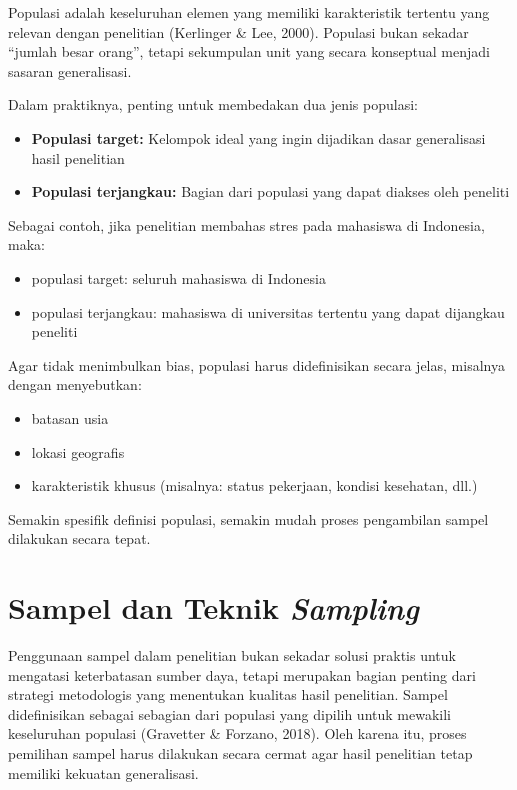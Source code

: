 \documentclass[
  indonesian,
  letterpaper,
  DIV=11,
  numbers=noendperiod]{scrreprt}
\providecommand{\tightlist}{%
  \setlength{\itemsep}{0pt}\setlength{\parskip}{0pt}}
\begin{document}
Populasi adalah keseluruhan elemen yang memiliki karakteristik tertentu
yang relevan dengan penelitian (Kerlinger \& Lee, 2000). Populasi bukan
sekadar ``jumlah besar orang'', tetapi sekumpulan unit yang secara
konseptual menjadi sasaran generalisasi.

Dalam praktiknya, penting untuk membedakan dua jenis populasi:

\begin{itemize}
\tightlist
\item
  \textbf{Populasi target:} Kelompok ideal yang ingin dijadikan dasar
  generalisasi hasil penelitian
\item
  \textbf{Populasi terjangkau:} Bagian dari populasi yang dapat diakses
  oleh peneliti
\end{itemize}

Sebagai contoh, jika penelitian membahas stres pada mahasiswa di
Indonesia, maka:

\begin{itemize}
\tightlist
\item
  populasi target: seluruh mahasiswa di Indonesia
\item
  populasi terjangkau: mahasiswa di universitas tertentu yang dapat
  dijangkau peneliti
\end{itemize}

Agar tidak menimbulkan bias, populasi harus didefinisikan secara jelas,
misalnya dengan menyebutkan:

\begin{itemize}
\tightlist
\item
  batasan usia
\item
  lokasi geografis
\item
  karakteristik khusus (misalnya: status pekerjaan, kondisi kesehatan,
  dll.)
\end{itemize}

Semakin spesifik definisi populasi, semakin mudah proses pengambilan
sampel dilakukan secara tepat.

\section{\texorpdfstring{Sampel dan Teknik
\emph{Sampling}}{Sampel dan Teknik Sampling}}\label{sampel-dan-teknik-sampling}

Penggunaan sampel dalam penelitian bukan sekadar solusi praktis untuk
mengatasi keterbatasan sumber daya, tetapi merupakan bagian penting dari
strategi metodologis yang menentukan kualitas hasil penelitian. Sampel
didefinisikan sebagai sebagian dari populasi yang dipilih untuk mewakili
keseluruhan populasi (Gravetter \& Forzano, 2018). Oleh karena itu,
proses pemilihan sampel harus dilakukan secara cermat agar hasil
penelitian tetap memiliki kekuatan generalisasi.
\end{document}
